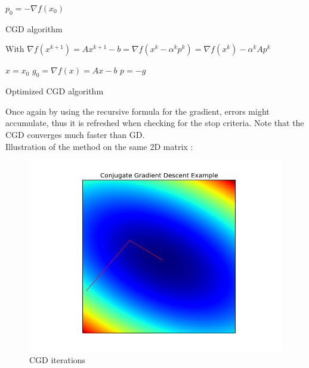 \documentclass[a4paper]{report}
\begin{document}
\begin{algorithm}[H]
 $p_0=- \nabla f(x_0)$\;
 \caption{CGD algorithm}
\end{algorithm}
With $\nabla f(x^{k+1})=Ax^{k+1}-b=\nabla f(x^k-\alpha ^kp^k)=\nabla f(x^k)-\alpha^kAp^k$
\\
\begin{algorithm}[H]
 $x=x_0$\;
 $g_0=\nabla f(x)=Ax-b$\;
 $p=- g$\;
 \caption{Optimized CGD algorithm}
\end{algorithm}
Once again by using the recursive formula for the gradient, errors might accumulate, thus it is refreshed when checking for the stop criteria. Note that the CGD converges much faster than GD.
\\
Illustration of the method on the same 2D matrix :


\begin{figure}[H]
\begin{center}
\includegraphics[scale=0.40]{CGD_example.png}\caption{CGD iterations}
\end{center}
\end{figure}
\end{document}
